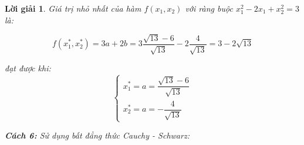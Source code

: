 \documentclass[14pt, a4paper]{article}
\theoremstyle{sltheorem}
\theoremstyle{soltheorem}
\newtheorem*{loigiai}{Lời giải}
\begin{document}
\begin{loigiai}
        Giá trị nhỏ nhất của hàm $f(x_1, x_2)$ với ràng buộc $x_1^2 - 2x_1 + x_2^2 = 3$ là:

        \begin{equation*}
            f(x_1^*, x_2^*) = 3 a + 2b = 3 \dfrac{\sqrt{13} - 6}{\sqrt{13}} - 2 \dfrac{4}{\sqrt{13}}  = 3 - 2\sqrt{13}
        \end{equation*}

        đạt được khi:
        \begin{equation*}
            \begin{cases} 
                x_1^* = a = \dfrac{\sqrt{13} - 6}{\sqrt{13}} \\ 
                x_2^* = a = - \dfrac{4}{\sqrt{13}} 
            \end{cases}
        \end{equation*}

        \textbf{Cách 6:} Sử dụng bất đẳng thức Cauchy - Schwarz:

    \end{loigiai}

    \newpage
    \printbibliography[title={TÀI LIỆU THAM KHẢO}]
\end{document}

